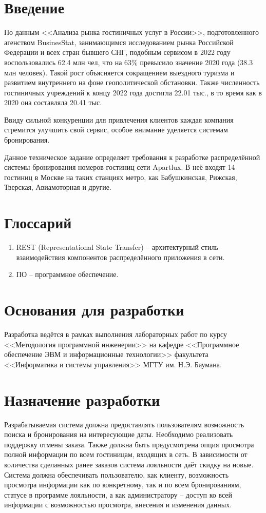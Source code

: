 \section*{Введение}
По данным <<Анализа рынка гостиничных услуг в России>>, подготовленного агенством BusinesStat, занимающимся исследованием рынка Российской Федерации и всех стран бывшего СНГ, подобным сервисом в 2022 году воспользовались 62.4 млн чел, что на 63\% превысило значение 2020 года (38.3 млн человек). Такой рост объясняется сокращением выездного туризма и развитием внутреннего на фоне геополитической обстановки. Также численность гостиничных учреждений к концу 2022 года достигла 22.01 тыс., в то время как в 2020 она составляла 20.41 тыс. 

Ввиду сильной конкуренции для привлечения клиентов каждая компания стремится улучшить свой сервис, особое внимание уделяется системам бронирования.

Данное техническое задание определяет требования к разработке распределённой системы бронирования номеров гостиниц сети Apartlux. В неё входят 14 гостиниц в Москве на таких станциях метро, как Бабушкинская, Рижская, Тверская, Авиамоторная и другие.

\section*{Глоссарий}
\begin{enumerate}
	\item REST (Representational State Transfer) -- архитектурный стиль взаимодействия компонентов распределённого приложения в сети. 
	\item ПО -- программное обеспечение.
\end{enumerate}

\section*{Основания для разработки}
Разработка ведётся в рамках выполнения лабораторных работ по курсу <<Методология программной инженерии>> на кафедре <<Программное обеспечение ЭВМ и информационные технологии>> факультета <<Информатика и системы управления>> МГТУ им. Н.Э. Баумана.

\section*{Назначение разработки}
Разрабатываемая система должна предоставлять пользователям возможность поиска и бронирования на интересующие даты. Необходимо реализовать поддержку отмены заказа. Также должна быть предусмотрена опция просмотра полной информации по всем гостиницам, входящих в сеть. В зависимости от количества сделанных ранее заказов система лояльности даёт скидку на новые. Система должна обеспечивать пользователю, как клиенту, возможность просмотра информации как по конкретному, так и по всем бронированиям, статусе в программе лояльности, а как администратору -- доступ ко всей информации с возможностью просмотра, внесения и изменения данных.

